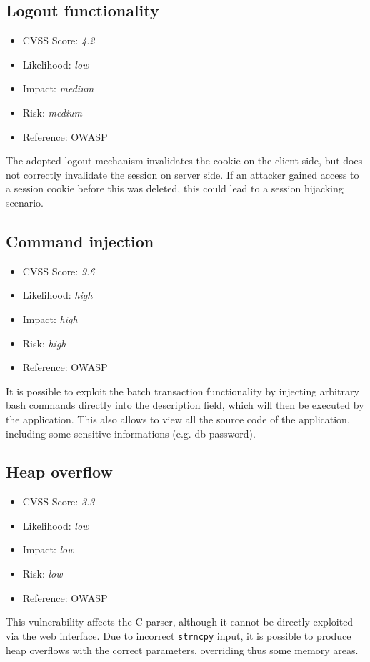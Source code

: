 \subsection{Logout functionality} \label{over:vuln_6}
\begin{itemize}
	\item CVSS Score: \textit{4.2}
	\item Likelihood: \textit{low}
	\item Impact: \textit{medium}
	\item Risk: \textit{medium}
	\item Reference: OWASP 
\end{itemize}
The adopted logout mechanism invalidates the cookie on the client side, but does not correctly invalidate the session on server side. If an attacker gained access to a session cookie before this was deleted, this could lead to a session hijacking scenario.

\subsection{Command injection} \label{over:vuln_7}
\begin{itemize}
	\item CVSS Score: \textit{9.6}
	\item Likelihood: \textit{high}
	\item Impact: \textit{high}
	\item Risk: \textit{high}
	\item Reference: OWASP 
\end{itemize}
It is possible to exploit the batch transaction functionality by injecting arbitrary bash commands directly into the description field, which will then be executed by the application.
This also allows to view all the source code of the application, including some sensitive informations (e.g. db password).

\subsection{Heap overflow} \label{over:vuln_8}
\begin{itemize}
	\item CVSS Score: \textit{3.3}
	\item Likelihood: \textit{low}
	\item Impact: \textit{low}
	\item Risk: \textit{low}
	\item Reference: OWASP 
\end{itemize}
This vulnerability affects the C parser, although it cannot be directly exploited via the web interface. Due to incorrect \texttt{strncpy} input, it is possible to produce heap overflows with the correct parameters, overriding thus some memory areas.

